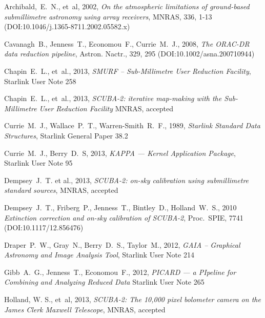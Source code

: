 \documentclass[twoside,11pt]{article}
\newcommand{\htmladdnormallink}[2]{#1}
\newcommand{\xref}[3]{#1}
\renewcommand{\_}{\texttt{\symbol{95}}}
\begin{document}
\begin{thebibliography}{}

Archibald,~E.~N., et~al, 2002, \htmladdnormallink{\textit{On the atmospheric limitations
of ground-based submillimetre astronomy using array receivers}}{
http://dx.doi.org/10.1046/j.1365-8711.2002.05582.x}, MNRAS, 336, 1-13
(DOI:10.1046/j.1365-8711.2002.05582.x)

Cavanagh~B., Jenness~T., Economou~F., Currie~M.~J., 2008,
\htmladdnormallink{\textit{The ORAC-DR data reduction
pipeline}}{http://dx.doi.org/10.1002/asna.200710944}, Astron. Nactr., 329, 295
(DOI:10.1002/asna.200710944)

Chapin~E.~L., et~al., 2013, \textit{SMURF -- Sub-Millimetre User Reduction
Facility}, \xref{Starlink User Note 258}{sun258}{}

Chapin~E.~L., et~al., 2013, \textit{SCUBA-2: iterative map-making with the
Sub-Millimetre User Reduction Facility} MNRAS,
\htmladdnormallink{accepted}{http://arxiv.org/abs/1301.3652}

Currie~M.~J., Wallace~P.~T., Warren-Smith~R.~F., 1989,
\textit{Starlink Standard Data Structures}, \xref{Starlink General
Paper 38.2}{sgp38}{}

Currie~M.~J., Berry~D.~S, 2013, \textit{KAPPA --- Kernel Application Package},
\xref{Starlink User Note 95}{sun95}{}

Dempsey~J.~T. et al., 2013, \textit{SCUBA-2: on-sky calibration using
submillimetre standard sources}, MNRAS,
\htmladdnormallink{accepted}{http://arxiv.org/abs/1301.3773}

Dempsey~J.~T., Friberg~P., Jenness~T., Bintley~D., Holland~W.~S., 2010
\htmladdnormallink{\textit{Extinction correction and on-sky calibration of
SCUBA-2}}{http://dx.doi.org/10.1117/12.856476},
Proc.\ SPIE, 7741 (DOI:10.1117/12.856476)

Draper~P.~W., Gray~N., Berry~D.~S., Taylor~M., 2012,
\textit{GAIA -- Graphical Astronomy and Image Analysis Tool},
\xref{Starlink User Note 214}{sun214}{}

Gibb~A.~G., Jenness~T., Economou~F., 2012, \textit{PICARD --- a
PIpeline for Combining and Analyzing Reduced Data}
\xref{Starlink User Note 265}{sun265}{}

Holland, W. S., et~al, 2013, \textit{SCUBA-2: The 10,000 pixel bolometer
camera on the James Clerk Maxwell Telescope}, MNRAS,
\htmladdnormallink{accepted}{http://arxiv.org/abs/1301.3650}


\end{thebibliography}
\end{document}
